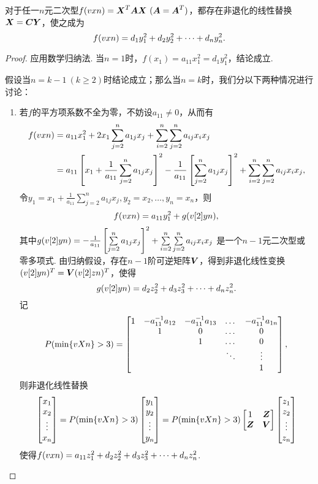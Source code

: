 \begin{theorem}
对于任一\(n\)元二次型\(f(\v{x}{n})=\x^T\A\x\ (\A=\A^T)\)，都存在非退化的线性替换\(\x=\C\mat{Y}\)，使之成为\[
f(\v{x}{n})=d_1 y_1^2 + d_2 y_2^2 + \dotsb + d_n y_n^2.
\]
\begin{proof}
应用数学归纳法.
当\(n=1\)时，\(f(x_1) = a_{11} x_1^2 = d_1 y_1^2\)，结论成立.

假设当\(n=k-1\ (k\geqslant2)\)时结论成立；那么当\(n=k\)时，我们分以下两种情况进行讨论：
\begin{enumerate}
\item 若\(f\)的平方项系数不全为零，不妨设\(a_{11}\neq0\)，从而有\begin{align*}
f(\v{x}{n}) &= a_{11} x_1^2 + 2 x_1 \sum\limits_{j=2}^n a_{1j} x_j + \sum\limits_{i=2}^n \sum\limits_{j=2}^n a_{ij} x_i x_j \\
&= a_{11} \left[
	x_1 + \frac{1}{a_{11}} \sum\limits_{j=2}^n a_{1j} x_j
\right]^2
- \frac{1}{a_{11}} \left[
	\sum\limits_{j=2}^n a_{1j} x_j
\right]^2
+ \sum\limits_{i=2}^n \sum\limits_{j=2}^n a_{ij} x_i x_j,
\end{align*}
令\(y_1 = x_1 + \frac{1}{a_{11}} \sum\limits_{j=2}^n a_{1j} x_j,
y_2 = x_2,
\dotsc,
y_n = x_n\)，则\[
f(\v{x}{n}) = a_{11} y_1^2 + g(\v[2]{y}{n}),
\]
其中\(g(\v[2]{y}{n})
= - \frac{1}{a_{11}} \left[
	\sum\limits_{j=2}^n a_{1j} x_j
\right]^2
+ \sum\limits_{i=2}^n \sum\limits_{j=2}^n a_{ij} x_i x_j\)%
是一个\(n-1\)元二次型或零多项式.
由归纳假设，存在\(n-1\)阶可逆矩阵\(\Q\)，得到非退化线性变换\((\v[2]{y}{n})^T = \Q (\v[2]{z}{n})^T\)，使得\[
g(\v[2]{y}{n})
= d_2 z_2^2 + d_3 z_3^2 + \dotsb + d_n z_n^2.
\]
记\[
\P = \begin{bmatrix}
1 & -a_{11}^{-1} a_{12} & -a_{11}^{-1} a_{13} & \dots & -a_{11}^{-1} a_{1n} \\
& 1 & 0 & \dots & 0 \\
& & 1 & \dots & 0 \\
& & & \ddots & \vdots \\
& & & & 1
\end{bmatrix},
\]则非退化线性替换\[
\begin{bmatrix}
x_1 \\ x_2 \\ \vdots \\ x_n
\end{bmatrix}
= \P \begin{bmatrix}
y_1 \\ y_2 \\ \vdots \\ y_n
\end{bmatrix}
= \P \begin{bmatrix} 1 & \z \\ \z & \Q \end{bmatrix} \begin{bmatrix}
z_1 \\ z_2 \\ \vdots \\ z_n
\end{bmatrix}
\]使得\(f(\v{x}{n}) = a_{11} z_1^2 + d_2 z_2^2 + d_3 z_3^2 + \dotsb + d_n z_n^2\).


\end{enumerate}
\end{proof}
\end{theorem}
